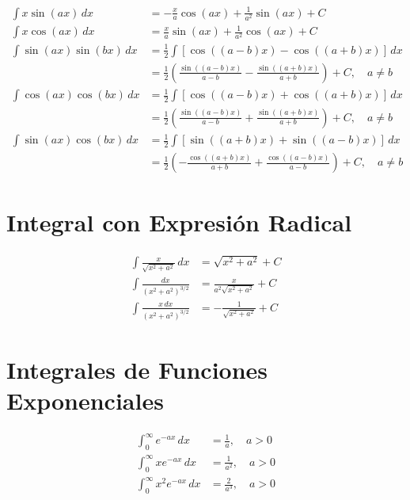 \documentclass[11pt]{article}
\begin{document}
\begin{align}
    \int x \sin(ax) \, dx &= -\frac{x}{a} \cos(ax) + \frac{1}{a^2} \sin(ax) + C \\[10pt]
    \int x \cos(ax) \, dx &= \frac{x}{a} \sin(ax) + \frac{1}{a^2} \cos(ax) + C \\[10pt]
    \int \sin(ax) \sin(bx) \, dx &= \frac{1}{2} \int [\cos((a-b)x) - \cos((a+b)x)] \, dx \\[10pt]
    &= \frac{1}{2} \left( \frac{\sin((a-b)x)}{a-b} - \frac{\sin((a+b)x)}{a+b} \right) + C, \quad a \neq b \\[10pt]
    \int \cos(ax) \cos(bx) \, dx &= \frac{1}{2} \int [\cos((a-b)x) + \cos((a+b)x)] \, dx \\[10pt]
    &= \frac{1}{2} \left( \frac{\sin((a-b)x)}{a-b} + \frac{\sin((a+b)x)}{a+b} \right) + C, \quad a \neq b \\[10pt]
    \int \sin(ax) \cos(bx) \, dx &= \frac{1}{2} \int [\sin((a+b)x) + \sin((a-b)x)] \, dx \\[10pt]
    &= \frac{1}{2} \left( -\frac{\cos((a+b)x)}{a+b} + \frac{\cos((a-b)x)}{a-b} \right) + C, \quad a \neq b
\end{align}

\section*{Integral con Expresión Radical}

\begin{align}
    \int \frac{x}{\sqrt{x^2 + a^2}} \, dx &= \sqrt{x^2 + a^2} + C \\[10pt]
    \int \frac{dx}{(x^2 + a^2)^{3/2}} &= \frac{x}{a^2 \sqrt{x^2 + a^2}} + C \\[10pt]
    \int \frac{x \, dx}{(x^2 + a^2)^{3/2}} &= -\frac{1}{\sqrt{x^2 + a^2}} + C
\end{align}


\section*{Integrales de Funciones Exponenciales}

\begin{align}
    \int_0^{\infty} e^{-ax} \, dx &= \frac{1}{a}, \quad a > 0 \\[10pt]
    \int_0^{\infty} x e^{-ax} \, dx &= \frac{1}{a^2}, \quad a > 0 \\[10pt]
    \int_0^{\infty} x^2 e^{-ax} \, dx &= \frac{2}{a^3}, \quad a > 0
\end{align}
\end{document}
